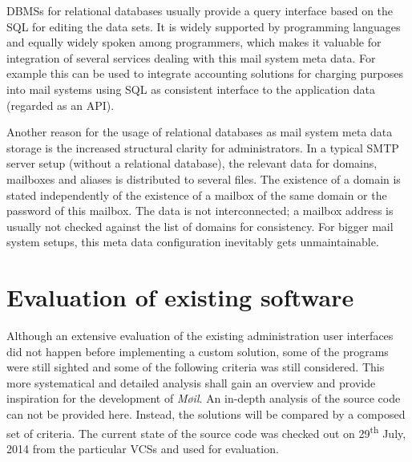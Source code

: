 \documentclass[12pt,a4paper]{scrartcl}
\begin{document}

		\acp{DBMS} for relational databases usually provide a query interface
		based on the \ac{SQL} \cite{sql} for editing the data sets. It is widely
		supported by programming languages and equally widely spoken among
		programmers, which makes it valuable for integration of several
		services dealing with this mail system meta data. For example this can
		be used to integrate accounting solutions for charging purposes into
		mail systems using \ac{SQL} as consistent interface to the application
		data (regarded as an \acs{API}).


		Another reason for the usage of relational databases as mail system
		meta data storage is the increased structural clarity for
		administrators. In a typical \acs{SMTP} \cite{smtp} server setup
		(without a relational database), the relevant data for domains,
		mailboxes and aliases is distributed to several files. The existence of
		a domain is stated independently of the existence of a mailbox of the
		same domain or the password of this mailbox. The data is not
		interconnected; a mailbox address is usually not checked against the
		list of domains for consistency. For bigger mail system setups, this
		meta data configuration inevitably gets unmaintainable.

	\section{Evaluation of existing software}

		Although an extensive evaluation of the existing administration user
		interfaces did not happen before implementing a custom solution, some
		of the programs were still sighted and some of the following criteria
		was still considered. This more systematical and detailed analysis
		shall gain an overview and provide inspiration for the development of
		\emph{Møil}. An in-depth analysis of the source code can not be
		provided here. Instead, the solutions will be compared by a composed
		set of criteria. The current state of the source code was checked out
		on 29\textsuperscript{th} July, 2014 from the particular \acp{VCS} and
		used for evaluation.
\end{document}
